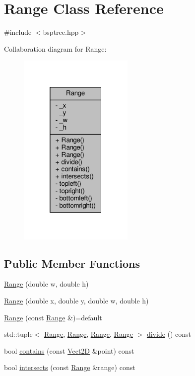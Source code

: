 \hypertarget{classRange}{}\section{Range Class Reference}
\label{classRange}


{\ttfamily \#include $<$bsptree.\+hpp$>$}



Collaboration diagram for Range\+:\nopagebreak
\begin{figure}[H]
\begin{center}
\leavevmode
\includegraphics[width=157pt]{classRange__coll__graph}
\end{center}
\end{figure}
\subsection*{Public Member Functions}
\begin{DoxyCompactItemize}
\item 
\hyperlink{classRange_aac818834ebf390ce2b1b8dea544f9123_aac818834ebf390ce2b1b8dea544f9123}{Range} (double w, double h)
\item 
\hyperlink{classRange_a3755a3d0c163bba29d5c7469e15765a0_a3755a3d0c163bba29d5c7469e15765a0}{Range} (double x, double y, double w, double h)
\item 
\hyperlink{classRange_a917b57d9db8d4176bd8963c8cc620d1b_a917b57d9db8d4176bd8963c8cc620d1b}{Range} (const \hyperlink{classRange}{Range} \&)=default
\item 
std\+::tuple$<$ \hyperlink{classRange}{Range}, \hyperlink{classRange}{Range}, \hyperlink{classRange}{Range}, \hyperlink{classRange}{Range} $>$ \hyperlink{classRange_a25a80b49faeb175b80a2028032abbed9_a25a80b49faeb175b80a2028032abbed9}{divide} () const
\item 
bool \hyperlink{classRange_a2d9877708da533077fc2eaeef29b89e4_a2d9877708da533077fc2eaeef29b89e4}{contains} (const \hyperlink{classVect2D}{Vect2D} \&point) const
\item 
bool \hyperlink{classRange_a75debf858d591b0b26ef6215616166a8_a75debf858d591b0b26ef6215616166a8}{intersects} (const \hyperlink{classRange}{Range} \&range) const
\end{DoxyCompactItemize}
